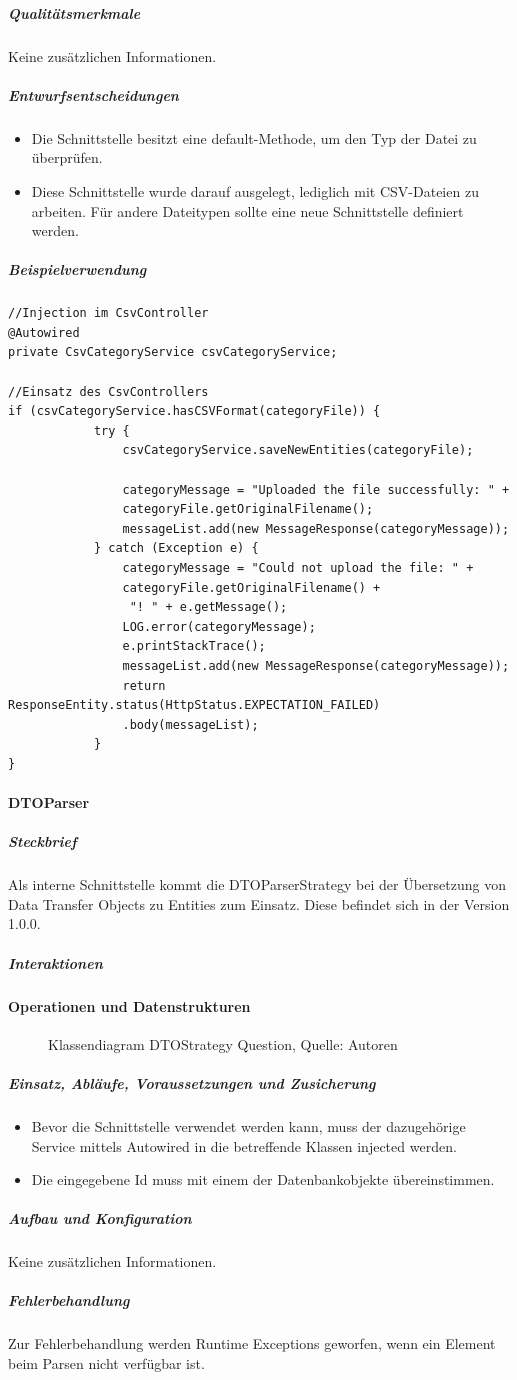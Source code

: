 \subparagraph{Qualitätsmerkmale}
Keine zusätzlichen Informationen.
\subparagraph{Entwurfsentscheidungen}
\begin{itemize}
    \item Die Schnittstelle besitzt eine default-Methode, um den Typ der Datei zu überprüfen.
    \item Diese Schnittstelle wurde darauf ausgelegt, lediglich mit CSV-Dateien zu arbeiten. Für andere Dateitypen sollte eine neue Schnittstelle definiert werden.
\end{itemize}

\subparagraph{Beispielverwendung}
\begin{verbatim}
//Injection im CsvController
@Autowired
private CsvCategoryService csvCategoryService;

//Einsatz des CsvControllers
if (csvCategoryService.hasCSVFormat(categoryFile)) {
            try {
                csvCategoryService.saveNewEntities(categoryFile);

                categoryMessage = "Uploaded the file successfully: " +
                categoryFile.getOriginalFilename();
                messageList.add(new MessageResponse(categoryMessage));
            } catch (Exception e) {
                categoryMessage = "Could not upload the file: " + 
                categoryFile.getOriginalFilename() +
                 "! " + e.getMessage();
                LOG.error(categoryMessage);
                e.printStackTrace();
                messageList.add(new MessageResponse(categoryMessage));
                return ResponseEntity.status(HttpStatus.EXPECTATION_FAILED)
                .body(messageList);
            }
}
\end{verbatim}
\newpage
\paragraph{DTOParser}
\subparagraph{Steckbrief}
Als interne Schnittstelle kommt die DTOParserStrategy bei der Übersetzung von Data Transfer Objects zu Entities zum Einsatz.
Diese befindet sich in der Version 1.0.0.
\subparagraph{Interaktionen}
\paragraph{Operationen und Datenstrukturen}
\begin{figure}[H]
    \centering
    \caption[Klassendiagram DTOStrategy Question]{Klassendiagram DTOStrategy Question, Quelle: Autoren}
    \label{img: dtoStrategy}
\end{figure}
\subparagraph{Einsatz, Abläufe, Voraussetzungen und Zusicherung}
\begin{itemize}
	\item Bevor die Schnittstelle verwendet werden kann, muss der dazugehörige Service mittels Autowired in die betreffende Klassen injected werden.
	\item Die eingegebene Id muss mit einem der Datenbankobjekte übereinstimmen.
\end{itemize}
\subparagraph{Aufbau und Konfiguration}
Keine zusätzlichen Informationen.
\subparagraph{Fehlerbehandlung}
Zur Fehlerbehandlung werden Runtime Exceptions geworfen, wenn ein Element beim Parsen nicht verfügbar ist.

